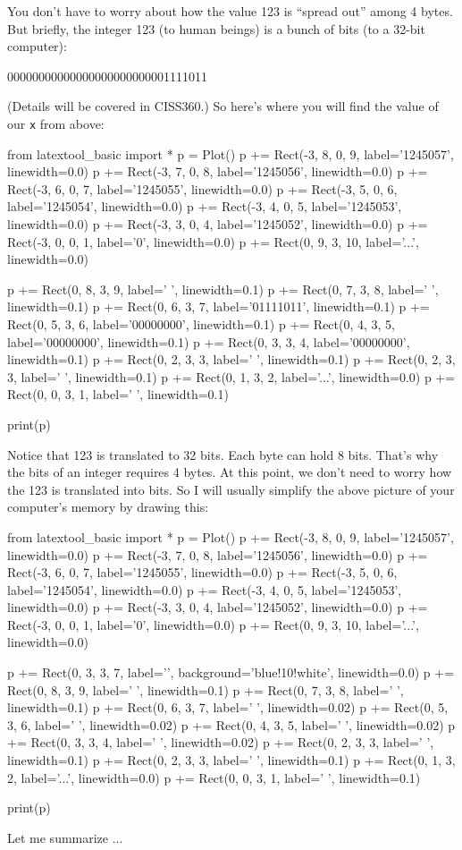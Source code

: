 You don't have to worry about how the value 123 is ``spread out'' among 4 bytes. But briefly, the integer 123 (to human beings) is a bunch of bits (to a 32-bit computer):
\begin{center}
00000000000000000000000001111011
\end{center}
(Details will be covered in CISS360.) So here's where you will find the value of our \texttt{x} from above:
\begin{python}
from latextool_basic import *
p = Plot()
p += Rect(-3, 8, 0, 9, label='1245057', linewidth=0.0)
p += Rect(-3, 7, 0, 8, label='1245056', linewidth=0.0)
p += Rect(-3, 6, 0, 7, label='1245055', linewidth=0.0)
p += Rect(-3, 5, 0, 6, label='1245054', linewidth=0.0)
p += Rect(-3, 4, 0, 5, label='1245053', linewidth=0.0)
p += Rect(-3, 3, 0, 4, label='1245052', linewidth=0.0)
p += Rect(-3, 0, 0, 1, label='0', linewidth=0.0)
p += Rect(0, 9, 3, 10, label='...', linewidth=0.0)

p += Rect(0, 8, 3, 9, label=' ', linewidth=0.1)
p += Rect(0, 7, 3, 8, label=' ', linewidth=0.1)
p += Rect(0, 6, 3, 7, label='01111011', linewidth=0.1)
p += Rect(0, 5, 3, 6, label='00000000', linewidth=0.1)
p += Rect(0, 4, 3, 5, label='00000000', linewidth=0.1)
p += Rect(0, 3, 3, 4, label='00000000', linewidth=0.1)
p += Rect(0, 2, 3, 3, label=' ', linewidth=0.1)
p += Rect(0, 2, 3, 3, label=' ', linewidth=0.1)
p += Rect(0, 1, 3, 2, label='...', linewidth=0.0)
p += Rect(0, 0, 3, 1, label=' ', linewidth=0.1)

print(p)
\end{python}
Notice that 123 is translated to 32 bits. Each byte can hold 8 bits. That's why the bits of an integer requires 4 bytes. At this point, we don't need to worry how the 123 is translated into bits. So I will usually simplify the above picture of your computer's memory by drawing this:
\begin{python}
from latextool_basic import *
p = Plot()
p += Rect(-3, 8, 0, 9, label='1245057', linewidth=0.0)
p += Rect(-3, 7, 0, 8, label='1245056', linewidth=0.0)
p += Rect(-3, 6, 0, 7, label='1245055', linewidth=0.0)
p += Rect(-3, 5, 0, 6, label='1245054', linewidth=0.0)
p += Rect(-3, 4, 0, 5, label='1245053', linewidth=0.0)
p += Rect(-3, 3, 0, 4, label='1245052', linewidth=0.0)
p += Rect(-3, 0, 0, 1, label='0', linewidth=0.0)
p += Rect(0, 9, 3, 10, label='...', linewidth=0.0)

p += Rect(0, 3, 3, 7, label='', background='blue!10!white', linewidth=0.0)
p += Rect(0, 8, 3, 9, label=' ', linewidth=0.1)
p += Rect(0, 7, 3, 8, label=' ', linewidth=0.1)
p += Rect(0, 6, 3, 7, label=' ', linewidth=0.02)
p += Rect(0, 5, 3, 6, label=' ', linewidth=0.02)
p += Rect(0, 4, 3, 5, label=' ', linewidth=0.02)
p += Rect(0, 3, 3, 4, label=' ', linewidth=0.02)
p += Rect(0, 2, 3, 3, label=' ', linewidth=0.1)
p += Rect(0, 2, 3, 3, label=' ', linewidth=0.1)
p += Rect(0, 1, 3, 2, label='...', linewidth=0.0)
p += Rect(0, 0, 3, 1, label=' ', linewidth=0.1)

print(p)
\end{python}
Let me summarize ...

